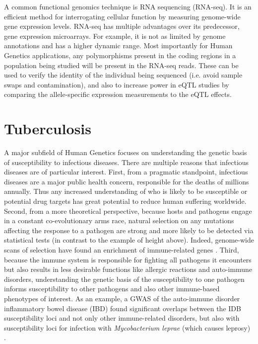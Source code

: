 A common functional genomics technique is RNA sequencing (RNA-seq). It
is an efficient method for interrogating cellular function by
measuring genome-wide gene expression levels. RNA-seq has multiple
advantages over its predecessor, gene expression microarrays. For
example, it is not as limited by genome annotations and has a higher
dynamic range. Most importantly for Human Genetics applications, any
polymorphisms present in the coding regions in a population being
studied will be present in the RNA-seq reads. These can be used to
verify the identity of the individual being sequenced (i.e. avoid
sample swaps and contamination), and also to increase power in eQTL
studies by comparing the allele-specific expression measurements to
the eQTL effects.

\section{Tuberculosis}

A major subfield of Human Genetics focuses on understanding the
genetic basis of susceptibility to infectious diseases. There are
multiple reasons that infectious diseases are of particular
interest. First, from a pragmatic standpoint, infectious diseases are
a major public health concern, responsible for the deaths of millions
annually. Thus any increased understanding of who is likely to be
susceptible or potential drug targets has great potential to reduce
human suffering worldwide. Second, from a more theoretical
perspective, because hosts and pathogens engage in a constant
co-evolutionary arms race, natural selection on any mutations
affecting the response to a pathogen are strong and more likely to be
detected via statistical tests (in contrast to the example of height
above). Indeed, genome-wide scans of selection have found an
enrichment of immune-related genes \citep{Fumagalli2014}. Third,
because the immune system is responsible for fighting all pathogens it
encounters but also results in less desirable functions like allergic
reactions and auto-immune disorders, understanding the genetic basis
of the susceptibility to one pathogen informs susceptibility to other
pathogens and also other immune-based phenotypes of interest. As an
example, a GWAS of the auto-immune disorder inflammatory bowel disease
(IBD) found significant overlaps between the IDB susceptibility loci
and not only other immune-related disorders, but also with
susceptibility loci for infection with \emph{Mycobacterium leprae}
(which causes leprosy) \citep{Jostins2012}.

